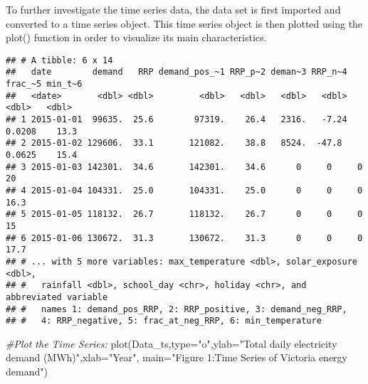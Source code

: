 \documentclass[
]{article}
\newenvironment{Shaded}{\begin{snugshade}}{\end{snugshade}}
\newcommand{\AttributeTok}[1]{\textcolor[rgb]{0.77,0.63,0.00}{#1}}
\newcommand{\CommentTok}[1]{\textcolor[rgb]{0.56,0.35,0.01}{\textit{#1}}}
\newcommand{\DecValTok}[1]{\textcolor[rgb]{0.00,0.00,0.81}{#1}}
\newcommand{\FunctionTok}[1]{\textcolor[rgb]{0.00,0.00,0.00}{#1}}
\newcommand{\NormalTok}[1]{#1}
\newcommand{\OtherTok}[1]{\textcolor[rgb]{0.56,0.35,0.01}{#1}}
\newcommand{\SpecialCharTok}[1]{\textcolor[rgb]{0.00,0.00,0.00}{#1}}
\newcommand{\StringTok}[1]{\textcolor[rgb]{0.31,0.60,0.02}{#1}}
\begin{document}
To further investigate the time series data, the data set is first
imported and converted to a time series object. This time series object
is then plotted using the plot() function in order to visualize its main
characteristics.

\begin{Shaded}
\end{Shaded}

\begin{verbatim}
## # A tibble: 6 x 14
##   date        demand   RRP demand_pos_~1 RRP_p~2 deman~3 RRP_n~4 frac_~5 min_t~6
##   <date>       <dbl> <dbl>         <dbl>   <dbl>   <dbl>   <dbl>   <dbl>   <dbl>
## 1 2015-01-01  99635.  25.6        97319.    26.4   2316.   -7.24  0.0208    13.3
## 2 2015-01-02 129606.  33.1       121082.    38.8   8524.  -47.8   0.0625    15.4
## 3 2015-01-03 142301.  34.6       142301.    34.6      0     0     0         20  
## 4 2015-01-04 104331.  25.0       104331.    25.0      0     0     0         16.3
## 5 2015-01-05 118132.  26.7       118132.    26.7      0     0     0         15  
## 6 2015-01-06 130672.  31.3       130672.    31.3      0     0     0         17.7
## # ... with 5 more variables: max_temperature <dbl>, solar_exposure <dbl>,
## #   rainfall <dbl>, school_day <chr>, holiday <chr>, and abbreviated variable
## #   names 1: demand_pos_RRP, 2: RRP_positive, 3: demand_neg_RRP,
## #   4: RRP_negative, 5: frac_at_neg_RRP, 6: min_temperature
\end{verbatim}

\begin{Shaded}
\begin{Highlighting}[]
\CommentTok{\#Plot the Time Series:}
\FunctionTok{plot}\NormalTok{(Data\_ts,}\AttributeTok{type=}\StringTok{"o"}\NormalTok{,}\AttributeTok{ylab=}\StringTok{"Total daily electricity demand (MWh)"}\NormalTok{,}\AttributeTok{xlab=}\StringTok{"Year"}\NormalTok{,}
     \AttributeTok{main=}\StringTok{"Figure 1:Time Series of Victoria energy demand"}\NormalTok{)}
\end{Highlighting}
\end{Shaded}
\end{document}
